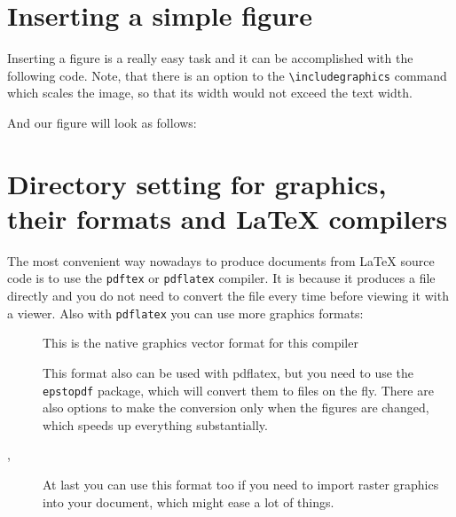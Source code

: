 \documentclass[
]{scrartcl}
\begin{document}
\clearpage
\section{Inserting a simple figure}

%
Inserting a figure is a really easy task and it can be accomplished with the
    following code. 
%
Note, that there is an option to the \verb|\includegraphics| command which
    scales the image, so that its width would not exceed the text width.
%

%
And our figure will look as follows:
%


\clearpage
\section{Directory setting for graphics, their formats and \LaTeX{} compilers}

%
The most convenient way nowadays to produce documents from \LaTeX{} source code
    is to use the \verb|pdftex| or \verb|pdflatex| compiler. 
%
It is because it produces a  file directly and you do not need to
    convert the  file every time before viewing it with a viewer.
%
Also with \verb|pdflatex| you can use more graphics formats:
%
\begin{description}
    \item[] This is the native graphics vector format for this compiler
    \item[] This format also can be used with pdflatex, but you need to use
        the \verb|epstopdf| package, which will convert them to
         files on the fly. There are also options to make the
        conversion only when the  figures are changed, which speeds
        up everything
        substantially.
    \item[, ] At last you can use this format too if you need to import
        raster graphics into your document, which might ease a lot of things.
\end{description}
\end{document}
